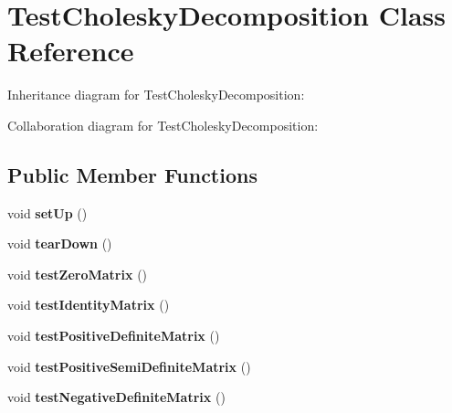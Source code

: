 \hypertarget{class_test_cholesky_decomposition}{\section{Test\+Cholesky\+Decomposition Class Reference}
\label{class_test_cholesky_decomposition}
}


Inheritance diagram for Test\+Cholesky\+Decomposition\+:


Collaboration diagram for Test\+Cholesky\+Decomposition\+:
\subsection*{Public Member Functions}
\begin{DoxyCompactItemize}
\item 
\hypertarget{class_test_cholesky_decomposition_ac1dbd2491611bc15b58910bcc69638cd}{void {\bfseries set\+Up} ()}\label{class_test_cholesky_decomposition_ac1dbd2491611bc15b58910bcc69638cd}

\item 
\hypertarget{class_test_cholesky_decomposition_a0aa7737eaa231702b46c0ddb1d030500}{void {\bfseries tear\+Down} ()}\label{class_test_cholesky_decomposition_a0aa7737eaa231702b46c0ddb1d030500}

\item 
\hypertarget{class_test_cholesky_decomposition_a9b0bcc800423339f11619e0da1a7de02}{void {\bfseries test\+Zero\+Matrix} ()}\label{class_test_cholesky_decomposition_a9b0bcc800423339f11619e0da1a7de02}

\item 
\hypertarget{class_test_cholesky_decomposition_a1fc074b72a7c85b19b06905cbec6265f}{void {\bfseries test\+Identity\+Matrix} ()}\label{class_test_cholesky_decomposition_a1fc074b72a7c85b19b06905cbec6265f}

\item 
\hypertarget{class_test_cholesky_decomposition_a043583073f035ce2899e0949ff802f72}{void {\bfseries test\+Positive\+Definite\+Matrix} ()}\label{class_test_cholesky_decomposition_a043583073f035ce2899e0949ff802f72}

\item 
\hypertarget{class_test_cholesky_decomposition_ae476849ec95200418623429e98f379b4}{void {\bfseries test\+Positive\+Semi\+Definite\+Matrix} ()}\label{class_test_cholesky_decomposition_ae476849ec95200418623429e98f379b4}

\item 
\hypertarget{class_test_cholesky_decomposition_a63294b48073f68a3af4c9e0d1d59c3aa}{void {\bfseries test\+Negative\+Definite\+Matrix} ()}\label{class_test_cholesky_decomposition_a63294b48073f68a3af4c9e0d1d59c3aa}


\end{DoxyCompactItemize}
